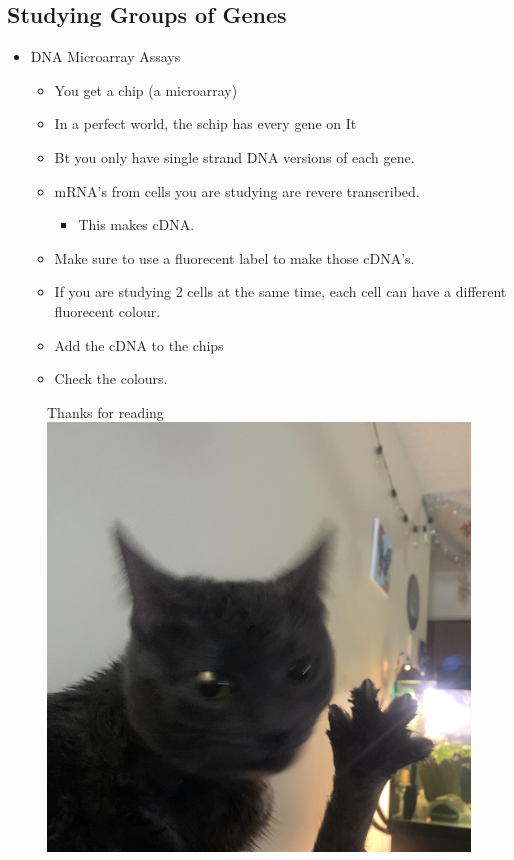 \documentclass{report}
\begin{document}

\subsection{Studying Groups of Genes}
\begin{itemize}
	\item DNA Microarray Assays
	\begin{itemize}
		\item You get a chip (a microarray)
		\item In a perfect world, the schip has every gene on It
		\item Bt you only have single strand DNA versions of each gene.
		\item mRNA's from cells you are studying are revere transcribed.
		\begin{itemize}
			\item This makes cDNA.
		\end{itemize}
		\item Make sure to use a fluorecent label to make those cDNA's.
		\item If you are studying 2 cells at the same time, each cell can have a different fluorecent colour.
		\item Add the cDNA to the chips
		\item Check the colours.
	\end{itemize}
\end{itemize}














\newpage
\begin{figure}
	\centering
	\Huge{Thanks for reading}
	\includegraphics[scale=0.2]{dabloon.jpg}
	\label{dabloonia}
\end{figure}
\end{document}
